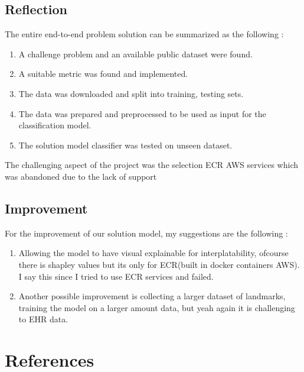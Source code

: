 \documentclass[
]{article}
\providecommand{\tightlist}{%
  \setlength{\itemsep}{0pt}\setlength{\parskip}{0pt}}
\begin{document}
\hypertarget{reflection}{%
\subsection{Reflection}\label{reflection}}

The entire end-to-end problem solution can be summarized as the
following :

\begin{enumerate}
\def\labelenumi{\arabic{enumi}.}
\tightlist
\item
  A challenge problem and an available public dataset were found.
\item
  A suitable metric was found and implemented.
\item
  The data was downloaded and split into training, testing sets.
\item
  The data was prepared and preprocessed to be used as input for the
  classification model.
\item
  The solution model classifier was tested on unseen dataset.
\end{enumerate}

The challenging aspect of the project was the selection ECR AWS services
which was abandoned due to the lack of support

\hypertarget{improvement}{%
\subsection{Improvement}\label{improvement}}

For the improvement of our solution model, my suggestions are the
following :

\begin{enumerate}
\def\labelenumi{\arabic{enumi}.}
\tightlist
\item
  Allowing the model to have visual explainable for interplatability,
  ofcourse there is shapley values but its only for ECR(built in docker
  containers AWS). I say this since I tried to use ECR services and
  failed.
\item
  Another possible improvement is collecting a larger dataset of
  landmarks, training the model on a larger amount data, but yeah again
  it is challenging to EHR data. \newpage
\end{enumerate}

\hypertarget{references}{%
\section*{References}\label{references}}
\end{document}
